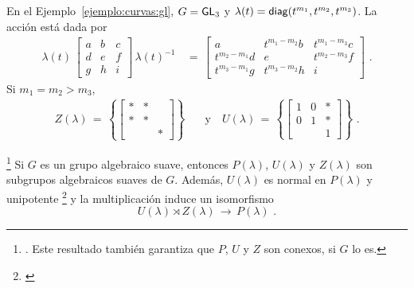 \begin{ejemploCurvas}\label{ejemplo:unipotente:curvas:gl}
	En el Ejemplo~\ref{ejemplo:curvas:gl}, $G=\GL[3]$ y
	$\lambda(t)=\diag(t^{m_1},t^{m_2},t^{m_3})$. La acci\'{o}n est\'{a}
	dada por
	\begin{align*}
		\lambda(t)\,
			\begin{bmatrix}
				a & b & c \\
				d & e & f \\
				g & h & i
			\end{bmatrix}\,\lambda(t)^{-1} & \,=\,
		\begin{bmatrix}
			a & t^{m_1-m_2}b & t^{m_1-m_3}c \\
			t^{m_2-m_1}d & e & t^{m_2-m_3}f \\
			t^{m_3-m_1}g & t^{m_3-m_2}h & i
		\end{bmatrix}
		\text{ .}
	\end{align*}
	Si $m_1=m_2>m_3$,
	\begin{align*}
		Z(\lambda) \,=\,\left\{
			\begin{bmatrix}
				* & * & \\
				* & * & \\
				& & *
			\end{bmatrix}\right\} & \quad\text{y}\quad
		U(\lambda) \,=\,\left\{
			\begin{bmatrix}
				1 & 0 & * \\
				0 & 1 & * \\
				& & 1
			\end{bmatrix}\right\}
		\text{ .}
	\end{align*}
\end{ejemploCurvas}

\begin{teoParabolicoSemidirecto}\label{thm:parabolicosemidirecto}
	\footnote{
		\cite[Theorem~13.33]{MilneAlgebraicGroups}. Este resultado
		tambi\'{e}n garantiza que $P$, $U$ y $Z$ son conexos, si $G$ lo
		es.
	}
	Si $G$ es un grupo algebraico suave, entonces $P(\lambda)$,
	$U(\lambda)$ y $Z(\lambda)$ son subgrupos algebraicos suaves de $G$.
	Adem\'{a}s, $U(\lambda)$ es normal en $P(\lambda)$ y unipotente%
	\footnote{
		\cite[Example~14.13]{MilneAlgebraicGroups}
	}
	y la multiplicaci\'{o}n induce un isomorfismo
	\begin{equation}
		\label{eq:parabolicosemidirecto}
		U(\lambda)\rtimes Z(\lambda)\,\rightarrow\,P(\lambda)
		\text{ .}
	\end{equation}
\end{teoParabolicoSemidirecto}

